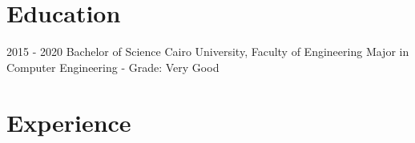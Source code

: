 \documentclass[a4paper]{twentysecondcv} %
\begin{document}
\makeprofile %

\vspace{-0.25cm}
\section{Education}{\faGraduationCap}

\begin{twenty} %
	\twentyitemshorttest
    	{2015 - 2020}
        {}
        {Bachelor of Science}
        {Cairo University, Faculty of Engineering}
        {Major in Computer Engineering - Grade: Very Good}

	
\end{twenty}


\vspace{-0.25cm}

\section{Experience}{\faAlignJustify}
\end{document}
